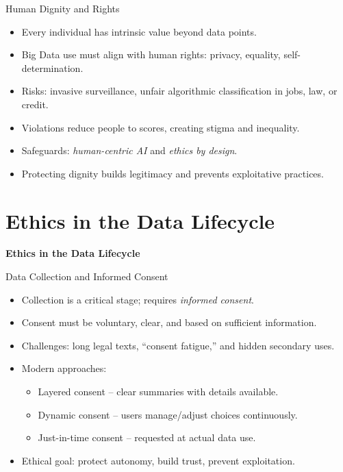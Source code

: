\documentclass[aspectratio=169, table]{beamer}
\begin{document}
\begin{frame}{Human Dignity and Rights}
	\vspace{20pt}
	\begin{itemize}
		\item Every individual has intrinsic value beyond data points.  
		\item Big Data use must align with human rights: privacy, equality, self-determination.  
		\item Risks: invasive surveillance, unfair algorithmic classification in jobs, law, or credit.  
		\item Violations reduce people to scores, creating stigma and inequality.  
		\item Safeguards: \textit{human-centric AI} and \textit{ethics by design}.  
		\item Protecting dignity builds legitimacy and prevents exploitative practices.  
	\end{itemize}
\end{frame}

\section{Ethics in the Data Lifecycle}
\begin{frame}{\hfill}
	\centering
	\Huge{\textbf{Ethics in the Data Lifecycle}}
\end{frame}

\begin{frame}{Data Collection and Informed Consent}
	\vspace{20pt}
	\begin{itemize}
		\item Collection is a critical stage; requires \textit{informed consent}.  
		\item Consent must be voluntary, clear, and based on sufficient information.  
		\item Challenges: long legal texts, “consent fatigue,” and hidden secondary uses.  
		\item Modern approaches:  
		\begin{itemize}
			\item Layered consent – clear summaries with details available.  
			\item Dynamic consent – users manage/adjust choices continuously.  
			\item Just-in-time consent – requested at actual data use.  
		\end{itemize}
		\item Ethical goal: protect autonomy, build trust, prevent exploitation.  
	\end{itemize}
\end{frame}
\end{document}

